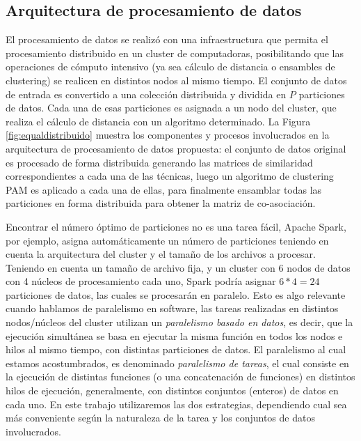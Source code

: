 \subsection{Arquitectura de procesamiento de datos}

El procesamiento de datos se realizó con una infraestructura que permita el procesamiento distribuido en un cluster de computadoras, posibilitando que las operaciones de cómputo intensivo (ya sea cálculo de distancia o ensambles de clustering) se realicen en distintos nodos al mismo tiempo. El conjunto de datos de entrada es convertido a una colección distribuida y dividida en \(P\) particiones de datos. Cada una de esas particiones es asignada a un nodo del cluster, que realiza el cálculo de distancia con un algoritmo determinado. La Figura \ref{fig:equaldistribuido} muestra los componentes y procesos involucrados en la arquitectura de procesamiento de datos propuesta: el conjunto de datos original es procesado de forma distribuida generando las matrices de similaridad correspondientes a cada una de las técnicas, luego un algoritmo de clustering PAM es aplicado a cada una de ellas, para finalmente ensamblar todas las particiones en forma distribuida para obtener la matriz de co-asociación.

\bigskip Encontrar el número óptimo de particiones no es una tarea fácil, Apache Spark, por ejemplo, asigna automáticamente un número de particiones teniendo en cuenta la arquitectura del cluster y el tamaño de los archivos a procesar. Teniendo en cuenta un tamaño de archivo fija, y un cluster con 6 nodos de datos con 4 núcleos de procesamiento cada uno, Spark podría asignar \(6*4=24\) particiones de datos, las cuales se procesarán en paralelo. Esto es algo relevante cuando hablamos de paralelismo en software, las tareas realizadas en distintos nodos/núcleos del cluster utilizan un \textit{paralelismo basado en datos}, es decir, que la ejecución simultánea se basa en ejecutar la misma función en todos los nodos e hilos al mismo tiempo, con distintas particiones de datos. El paralelismo al cual estamos acostumbrados, es denominado \textit{paralelismo de tareas}, el cual consiste en la ejecución de distintas funciones (o una concatenación de funciones) en distintos hilos de ejecución, generalmente, con distintos conjuntos (enteros) de datos en cada uno. En este trabajo utilizaremos las dos estrategias, dependiendo cual sea más conveniente según la naturaleza de la tarea y los conjuntos de datos involucrados.

